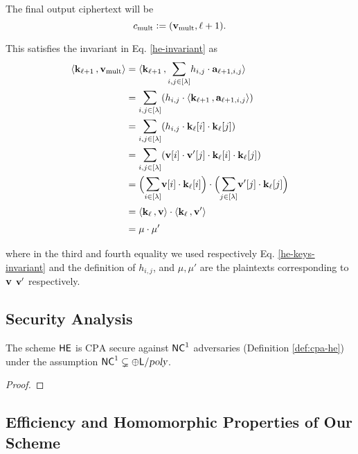 \begin{itemize}
\begin{itemize}
The final output ciphertext will be
\[
c_{\text{mult}} \vcentcolon= (\mathbf{v}_{\text{mult}}, \ell+1).
\]

This satisfies the invariant in Eq. \ref{he-invariant} as
\begin{align*}
 \inprod{\klp}{\v_{\text{mult}}} &=  \inprod{\klp}{\Sum_{i,j \in [\lambda]} h_{i,j}\cdot \a_{\ell+1,i,j}} \\
                                &= \Sum_{i,j \in [\lambda]} ( h_{i,j} \cdot \inprod{\klp}{\a_{\ell+1,i,j}} )\\
                                &=\Sum_{i,j \in [\lambda]} ( h_{i,j} \cdot \kl[i]\cdot\kl[j] )\\
                                &= \Sum_{i,j \in [\lambda]} ( \v[i] \cdot \v'[j] \cdot \kl[i]\cdot\kl[j] )\\
                                &= \Big(\Sum_{i \in [\lambda]} \v[i] \cdot \kl[i]\Big)\cdot\Big(\Sum_{j \in [\lambda]} \v'[j] \cdot \kl[j]\Big)\\
                                &= \inprod{\kl}{\v}\cdot\inprod{\kl}{\v'}\\
                                &= \mu \cdot \mu'
\end{align*}

where in the third and fourth equality we used respectively Eq. \ref{he-keys-invariant} and the definition of $h_{i,j}$, and $\mu, \mu'$ are the plaintexts corresponding to $\mathbf{v}$ $\mathbf{v}'$ respectively.

\end{itemize}
\end{itemize}


\subsection{Security Analysis}

\begin{theorem}[Security]
The scheme $\mathsf{HE}$ is $\text{CPA}$ secure against ${\mathsf{NC}}^1$ adversaries (Definition \ref{def:cpa-he}) under the assumption ${\mathsf{NC}}^1 \subsetneq \oplus {\ensuremath{\mathsf{L}}} / {\textsl{poly}}$.
\end{theorem} 
\begin{proof}

\end{proof}

\subsection{Efficiency and Homomorphic Properties of Our Scheme}

